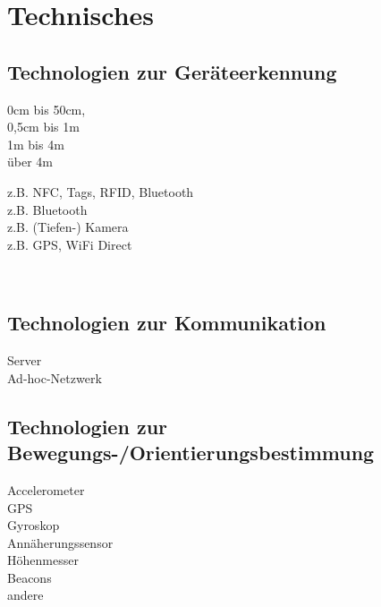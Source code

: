 
\section*{Technisches}

\subsection*{Technologien zur Geräteerkennung}


\begin{minipage}{0.3\textwidth}
\checkbox{\technologyObjectIntimate} 0cm bis 50cm, \\
\checkbox{\technologyObjectPersonal} 0,5cm bis 1m \\
\checkbox{\technologyObjectSocial} 1m bis 4m \\
\checkbox{\technologyObjectPublic} über 4m 
\end{minipage}
\begin{minipage}{0.5\textwidth}
z.B. NFC, Tags, RFID, Bluetooth \\
z.B. Bluetooth \\
z.B. (Tiefen-) Kamera \\
z.B. GPS, WiFi Direct
\end{minipage}\\

\technologyObjectDesc

\subsection*{Technologien zur Kommunikation}
\checkbox{\technologyCommunicationServer} Server \\
\checkbox{\technologyCommunicationAdhoc} Ad-hoc-Netzwerk 

\technologyCommunicationDesc

\subsection*{Technologien zur Bewegungs-/Orientierungsbestimmung}
\checkbox{\technologyOrientationAccelerometer} Accelerometer \\
\checkbox{\technologyOrientationGPS} GPS \\
\checkbox{\technologyOrientationGyroskop} Gyroskop \\
\checkbox{\technologyOrientationAnnaeherung} Annäherungssensor \\
\checkbox{\technologyOrientationHoehe} Höhenmesser \\
\checkbox{\technologyOrientationBeacons} Beacons \\
\checkbox{\technologyOrientationOther} andere \\

